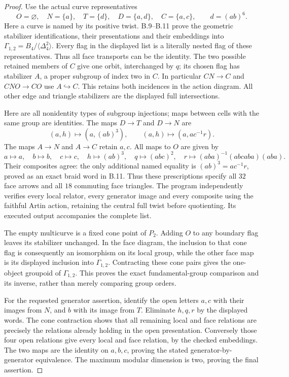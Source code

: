 \begin{proof}
Use the actual curve representatives
\[
 O=\varnothing,\quad N=\{a\},\quad T=\{d\},\quad
 D=\{a,d\},\quad C=\{a,c\},\qquad d=(ab)^6.
\]
Here a curve is named by its positive twist.  B.9--B.11
prove the geometric stabilizer identifications, their
presentations and their embeddings into
$\Gamma_{1,2}=B_4/\langle\Delta_4^2\rangle$.
Every flag in the displayed list is a literally nested
flag of these representatives.  Thus all face transports
can be the identity.  The two possible retained members
of $C$ give one orbit, interchanged by $q$; its chosen
flag has stabilizer $A$, a proper subgroup of index two
in $C$.  In particular $CN\to C$ and $CNO\to CO$ use
$A\hookrightarrow C$.  This retains both incidences in
the action diagram.  All other edge and triangle
stabilizers are the displayed full intersections.

Here are all nonidentity types of subgroup injections;
maps between cells with the same group are identities.
The maps $D\to T$ and $D\to N$ are
\[
 (a,h)\longmapsto(a,(ab)^3),\qquad
 (a,h)\longmapsto(a,ac^{-1}r).
\]
The maps $A\to N$ and $A\to C$ retain $a,c$.
All maps to $O$ are given by
\[
 a\mapsto a,\quad b\mapsto b,\quad c\mapsto c,
 \quad h\mapsto(ab)^3,\quad q\mapsto(abc)^2,
 \quad r\mapsto(aba)^{-1}(abcaba)(aba).
\]
Their composites agree: the only additional named equality
is $(ab)^3=ac^{-1}r$, proved as an exact braid word in
B.11.  Thus these prescriptions specify all $32$ face
arrows and all $18$ commuting face triangles.
The program independently verifies every local relator,
every generator image and every composite using the
faithful Artin action, retaining the central full twist
before quotienting.  Its executed output accompanies the
complete list.

The empty multicurve is a fixed cone point of $P_2$.
Adding $O$ to any boundary flag leaves its stabilizer
unchanged.  In the face diagram, the inclusion to that
cone flag is consequently an isomorphism on its local
group, while the other face map is its displayed
inclusion into $\Gamma_{1,2}$.  Contracting these cone
pairs gives the one-object groupoid of $\Gamma_{1,2}$.
This proves the exact fundamental-group comparison and
its inverse, rather than merely comparing group orders.

For the requested generator assertion, identify the
open letters $a,c$ with their images from $N$, and
$b$ with its image from $T$.  Eliminate $h,q,r$ by the
displayed words.  The cone contraction shows that all
remaining local and face relations are precisely the
relations already holding in the open presentation.
Conversely those four open relations give every local
and face relation, by the checked embeddings.  The two
maps are the identity on $a,b,c$, proving the stated
generator-by-generator equivalence.  The maximum
modular dimension is two, proving the final assertion.
\end{proof}


